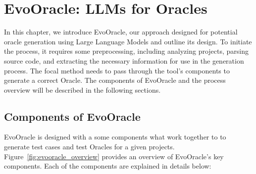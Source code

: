 \chapter{EvoOracle: LLMs for Oracles}
\label{cha:evoOracles}
\vspace{0.4 cm}

In this chapter, we introduce EvoOracle, our approach designed for potential oracle generation using Large Language Models and outline its design. To initiate the process, it requires some preprocessing, including analyzing projects, parsing source code, and extracting the necessary information for use in the generation process. The focal method needs to pass through the tool's components to generate a correct Oracle. The components of EvoOracle and the process overview will be described in the following sections.

\section{Components of EvoOracle}
\label{sec:components}
\vspace{0.2 cm}
EvoOracle is designed with a some components what work together to to generate test cases and test Oracles for a given projects. Figure~\ref{fig:evooracle_overview} provides an overview of EvoOracle's key components. Each of the components are explained in details below:

